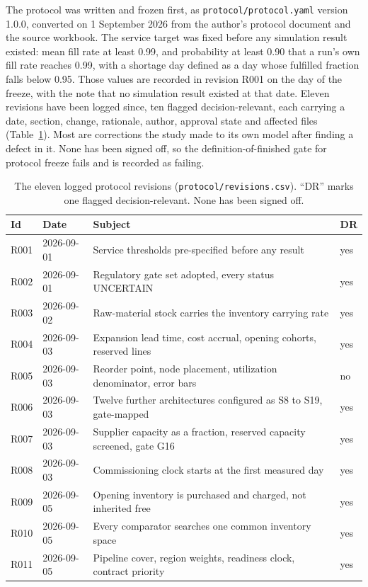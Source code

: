 The protocol was written and frozen first, as \texttt{protocol/protocol.yaml} version 1.0.0,
converted on 1 September 2026 from the author's protocol document and the source workbook. The
service target was fixed before any simulation result existed: mean fill rate at least 0.99,
and probability at least 0.90 that a run's own fill rate reaches 0.99, with a shortage day
defined as a day whose fulfilled fraction falls below 0.95. Those values are recorded in
revision R001 on the day of the freeze, with the note that no simulation result existed at that
date. Eleven revisions have been logged since, ten flagged decision-relevant, each carrying a
date, section, change, rationale, author, approval state and affected files
(Table~\ref{tab:revisions}). Most are corrections the study made to its own model after finding
a defect in it. None has been signed off, so the definition-of-finished gate for protocol freeze
fails and is recorded as failing.

\begin{table}[htbp]
\centering
\caption{The eleven logged protocol revisions (\texttt{protocol/revisions.csv}). ``DR'' marks
one flagged decision-relevant. None has been signed off.}
\label{tab:revisions}
\footnotesize
\setlength{\tabcolsep}{5pt}
\begin{tabular}{@{}llll@{}}
\toprule
Id & Date & Subject & DR \\
\midrule
R001 & 2026-09-01 & Service thresholds pre-specified before any result & yes \\
R002 & 2026-09-01 & Regulatory gate set adopted, every status UNCERTAIN & yes \\
R003 & 2026-09-02 & Raw-material stock carries the inventory carrying rate & yes \\
R004 & 2026-09-03 & Expansion lead time, cost accrual, opening cohorts, reserved lines & yes \\
R005 & 2026-09-03 & Reorder point, node placement, utilization denominator, error bars & no \\
R006 & 2026-09-03 & Twelve further architectures configured as S8 to S19, gate-mapped & yes \\
R007 & 2026-09-03 & Supplier capacity as a fraction, reserved capacity screened, gate G16 & yes \\
R008 & 2026-09-03 & Commissioning clock starts at the first measured day & yes \\
R009 & 2026-09-05 & Opening inventory is purchased and charged, not inherited free & yes \\
R010 & 2026-09-05 & Every comparator searches one common inventory space & yes \\
R011 & 2026-09-05 & Pipeline cover, region weights, readiness clock, contract priority & yes \\
\bottomrule
\end{tabular}
\end{table}

